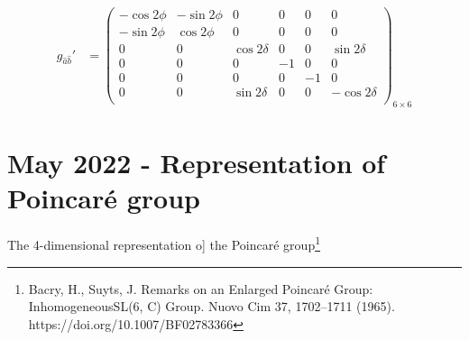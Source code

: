 \documentclass[]{article}
\numberwithin{equation}{section}
\begin{document}
{{\begin{align}
      g_{\hat{a}\hat{b}}'&=\begin{pmatrix}
  -\cos{2\phi}&-\sin{2\phi}&0&0&0&0\\
  -\sin{2\phi}&\cos{2\phi}&0&0&0&0\\
  0&0&\cos{2\delta}&0&0&\sin{2\delta}\\
  0&0&0&-1&0&0\\
  0&0&0&0&-1&0\\
  0&0&\sin{2\delta}&0&0&-\cos{2\delta}\\
  \end{pmatrix}_{6\times6}
  \end{align}


  \section{May 2022 - Representation of Poincaré group}
The 4-dimensional representation o] the Poincaré group\footnote{Bacry, H., Suyts, J. Remarks on an Enlarged Poincaré Group: InhomogeneousSL(6, C) Group. Nuovo Cim 37, 1702–1711 (1965). https://doi.org/10.1007/BF02783366}

}}
\end{document}
